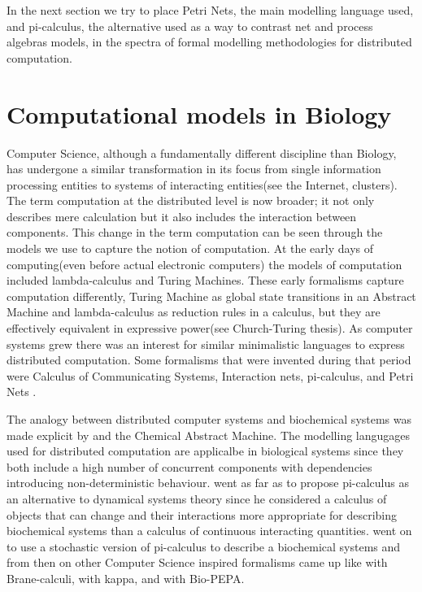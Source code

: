 In the next section we try to place Petri Nets, the main modelling
language used, and pi-calculus, the alternative used as a way to
contrast net and process algebras models, in the spectra of formal
modelling methodologies for distributed computation.

\section{Computational models in Biology}
Computer Science, although a fundamentally different discipline than
Biology, has undergone a similar transformation in its focus from
single information processing entities to systems of interacting
entities(see the Internet, clusters). The term computation at the
distributed level is now broader; it not only describes mere
calculation but it also includes the interaction between
components. This change in the term computation can be seen through
the models we use to capture the notion of computation. At the early
days of computing(even before actual electronic computers) the models
of computation included lambda-calculus and Turing Machines. These
early formalisms capture computation differently, Turing Machine as
global state transitions in an Abstract Machine and lambda-calculus
as reduction rules in a calculus, but they are effectively equivalent
in expressive power(see Church-Turing thesis). As computer systems
grew there was an interest for similar
minimalistic languages to express distributed computation. Some
formalisms that were invented during that period were
\citet{milner1980calculus} Calculus of Communicating Systems,
\citet{lafont1989interaction} Interaction nets,
\citet{milner1992calculus} pi-calculus, and Petri
Nets \cite [] {murata1989petri}.

The analogy between distributed computer systems and biochemical
systems was made explicit by \citet{berry1989chemical} and the
Chemical Abstract Machine. The modelling langugages used for
distributed computation are applicalbe in biological systems since
they both include a high number of concurrent components with dependencies
introducing non-deterministic behaviour. \citet{fontana1996barrier} went as far as
to propose pi-calculus as an alternative to dynamical systems
theory since he considered a calculus of objects that can change and their
interactions more appropriate for describing biochemical systems than a calculus of continuous
interacting quantities. \citet{priami2001application} went on to use a
stochastic version of pi-calculus to describe a biochemical systems
and from then on other Computer Science inspired formalisms came up like
\citet{cardelli2005brane} with Brane-calculi, \citet{danos2004formal}
with kappa, and
\citet{ciocchetta2009bio} with Bio-PEPA.

